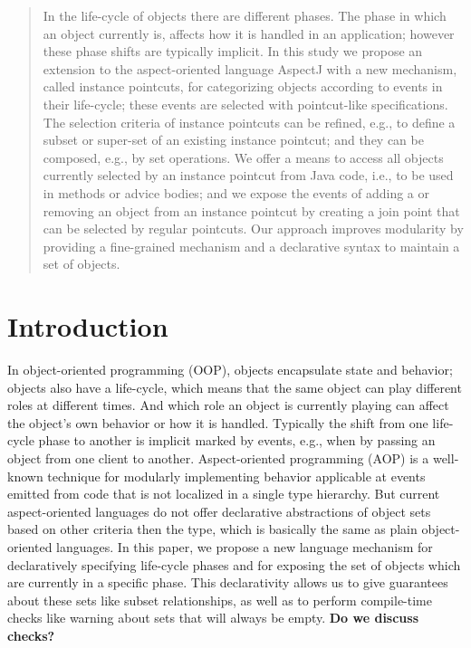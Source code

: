 \maketitle

\begin{abstract}
In the life-cycle of objects there are different phases. The phase in which an object currently is, affects how it is handled in an application; however these phase shifts are typically implicit.
In this study we propose an extension to the aspect-oriented language AspectJ with a new mechanism, called instance pointcuts, for categorizing objects according to events in their life-cycle; these events are selected with pointcut-like specifications.
The selection criteria of instance pointcuts can be refined, e.g., to define a subset or super-set of an existing instance pointcut; and they can be composed, e.g., by set operations.
We offer a means to access all objects currently selected by an instance pointcut from Java code, i.e., to be used in methods or advice bodies; and we expose the events of adding a or removing an object from an instance pointcut by creating a join point that can be selected by regular pointcuts.
Our approach improves modularity by providing a fine-grained mechanism and a declarative syntax to maintain a set of objects.
\end{abstract}

\section{Introduction}
In object-oriented programming (OOP), objects encapsulate state and behavior; objects also have a life-cycle, which means that the same object can play different roles at different times.
And which role an object is currently playing can affect the object's own behavior or how it is handled.
Typically the shift from one life-cycle phase to another is implicit marked by events, e.g., when by passing an object from one client to another.
Aspect-oriented programming (AOP) is a well-known technique for modularly implementing behavior applicable at events emitted from code that is not localized in a single type hierarchy.
But current aspect-oriented languages do not offer declarative abstractions of object sets based on other criteria then the type, which is basically the same as plain object-oriented languages.
In this paper, we propose a new language mechanism for declaratively specifying life-cycle phases and for exposing the set of objects which are currently in a specific phase. This declarativity allows us to give guarantees about these sets like subset relationships, as well as to perform compile-time checks like warning about sets that will always be empty. \textbf{Do we discuss checks?}

